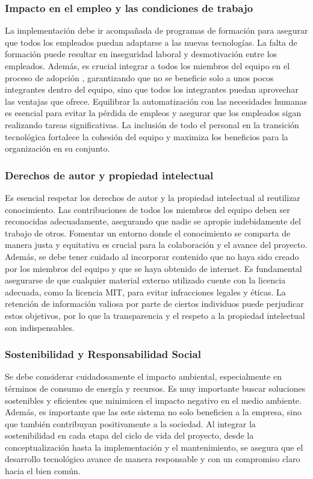 \subsubsection{Impacto en el empleo y las condiciones de trabajo}
La implementación debe ir acompañada de programas de formación para asegurar 
que todos los empleados puedan adaptarse a las nuevas tecnologías. La falta de formación 
puede resultar en inseguridad laboral y desmotivación entre los empleados. Además, es 
crucial integrar a todos los miembros del equipo en el proceso de adopción , 
garantizando que no se beneficie solo a unos pocos integrantes dentro del equipo, sino que 
todos los integrantes puedan aprovechar las ventajas que ofrece. Equilibrar 
la automatización con las necesidades humanas es esencial para evitar la pérdida de 
empleos y asegurar que los empleados sigan realizando tareas significativas. La inclusión 
de todo el personal en la transición tecnológica fortalece la cohesión del equipo y 
maximiza los beneficios para la organización en su conjunto.

\subsubsection{Derechos de autor y propiedad intelectual}
Es esencial respetar los derechos de autor y la propiedad intelectual 
al reutilizar conocimiento. Las contribuciones de todos los miembros 
del equipo deben ser reconocidas adecuadamente, asegurando que nadie se 
apropie indebidamente del trabajo de otros. Fomentar un entorno donde el 
conocimiento se comparta de manera justa y equitativa es crucial para la colaboración 
y el avance del proyecto. Además, se debe tener cuidado al incorporar contenido que 
no haya sido creado por los miembros del equipo y que se haya obtenido de internet. 
Es fundamental asegurarse de que cualquier material externo utilizado cuente con la 
licencia adecuada, como la licencia MIT, para evitar infracciones legales y éticas. La 
retención de información valiosa por parte de ciertos individuos puede perjudicar 
estos objetivos, por lo que la transparencia y el respeto a la propiedad intelectual son indispensables.

\subsubsection{Sostenibilidad y Responsabilidad Social} 
Se debe considerar cuidadosamente el impacto ambiental, especialmente en términos de 
consumo de energía y recursos. Es muy importante buscar soluciones sostenibles y 
eficientes que minimicen el impacto negativo en el medio ambiente. Además, es importante que 
las este sistema no solo beneficien a la empresa, sino que también contribuyan positivamente 
a la sociedad. Al integrar la sostenibilidad en cada etapa del ciclo de vida del proyecto, 
desde la conceptualización hasta la implementación y el mantenimiento, se asegura que el 
desarrollo tecnológico avance de manera responsable y con un compromiso claro hacia el bien común.


